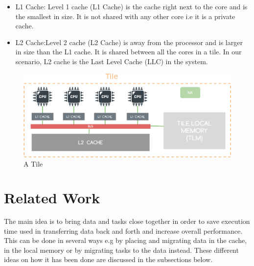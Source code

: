 \documentclass{listhesis}
\begin{document}
\begin{itemize}
  \item L1 Cache: Level 1 cache (L1 Cache) is the cache right next to the core and is the smallest in size. It is not shared with any other core i.e it is a private cache.
  \item L2 Cache:Level 2 cache (L2 Cache) is away from the processor and is larger in size than the L1 cache. It is shared between all the cores in a tile. In our scenario, L2 cache is the Last Level Cache (LLC) in the system.
\end{itemize}
\begin{figure}
  \includegraphics[width=\linewidth]{tile.png}
  \centering
  \caption{A Tile}
  \label{fig:tile}
\end{figure}
\section{Related Work}
The main idea is to bring data and tasks close together in order to save execution time used in transferring data back and forth and increase overall performance. This can be done in several ways e.g by placing and migrating data in the cache, in the local memory or by migrating tasks to the data instead. These different ideas on how it has been done are discussed in the subsections below. 
\end{document}

